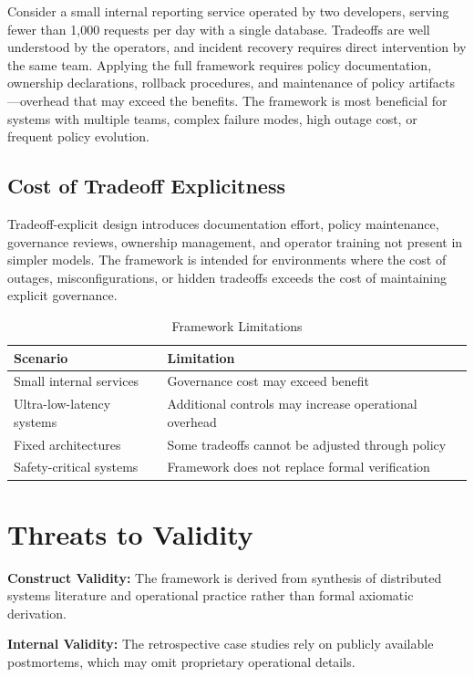 \documentclass[conference]{IEEEtran}
\begin{document}
Consider a small internal reporting service operated by two developers, serving fewer than 1,000 requests per day with a single database. Tradeoffs are well understood by the operators, and incident recovery requires direct intervention by the same team. Applying the full framework requires policy documentation, ownership declarations, rollback procedures, and maintenance of policy artifacts---overhead that may exceed the benefits. The framework is most beneficial for systems with multiple teams, complex failure modes, high outage cost, or frequent policy evolution.

\subsection{Cost of Tradeoff Explicitness}

Tradeoff-explicit design introduces documentation effort, policy maintenance, governance reviews, ownership management, and operator training not present in simpler models. The framework is intended for environments where the cost of outages, misconfigurations, or hidden tradeoffs exceeds the cost of maintaining explicit governance.

\begin{table}[t]
\caption{Framework Limitations}
\centering
\small
\begin{tabular}{@{}p{3cm} p{4cm}@{}}
\toprule
Scenario & Limitation \\
\midrule
Small internal services & Governance cost may exceed benefit \\
Ultra-low-latency systems & Additional controls may increase operational overhead \\
Fixed architectures & Some tradeoffs cannot be adjusted through policy \\
Safety-critical systems & Framework does not replace formal verification \\
\bottomrule
\end{tabular}
\end{table}

\section{Threats to Validity}

\textbf{Construct Validity:}
The framework is derived from synthesis of distributed systems literature and operational practice rather than formal axiomatic derivation.

\textbf{Internal Validity:}
The retrospective case studies rely on publicly available postmortems, which may omit proprietary operational details.
\end{document}
